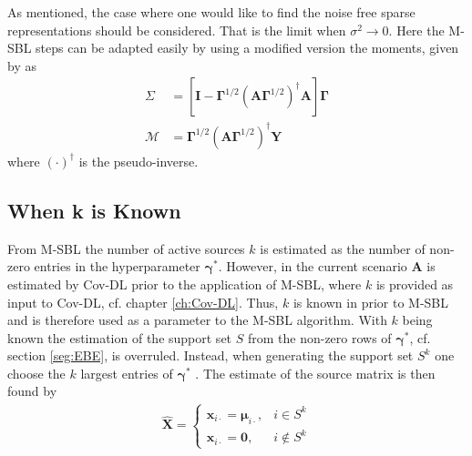 As mentioned, the case where one would like to find the noise free sparse representations should be considered. That is the limit when $\sigma^2\rightarrow 0$. Here the M-SBL steps can be adapted easily by using a modified version the moments, given by \cite[p.148]{phd_wipf} as 
\begin{align*}
\Sigma &= \left[ \textbf{I} - \boldsymbol{\Gamma}^{1/2} \left( \mathbf{A} \boldsymbol{\Gamma}^{1/2}\right)^{\dagger} \mathbf{A} \right]\boldsymbol{\Gamma}\\
\mathcal{M} &= \boldsymbol{\Gamma}^{1/2}\left( \mathbf{A} \boldsymbol{\Gamma}^{1/2}\right)^{\dagger} \mathbf{Y}
\end{align*} 
where $(\cdot)^{\dagger}$ is the pseudo-inverse.

\subsection{When k is Known}\label{subsec:kestimate}
From M-SBL the number of active sources $k$ is estimated as the number of non-zero entries in the hyperparameter $\boldsymbol{\gamma}^{\ast}$.
However, in the current scenario $\textbf{A}$ is estimated by Cov-DL prior to the application of M-SBL, where $k$ is provided as input to Cov-DL, cf. chapter \ref{ch:Cov-DL}.
Thus, $k$ is known in prior to M-SBL and is therefore used as a parameter to the M-SBL algorithm. 
With $k$ being known the estimation of the support set $S$ from the non-zero rows of $\boldsymbol{\gamma}^{\ast}$, cf. section \ref{seg:EBE}, is overruled.
Instead, when generating the support set $S^k$ one choose the $k$ largest entries of $\boldsymbol{\gamma}^{\ast}$ \cite[p. 3]{Balkan2014}.
The estimate of the source matrix is then found by
\begin{align*}
\hat{\mathbf{X}} = 
\begin{cases}
\mathbf{x}_{i\cdot} = \boldsymbol{\mu}_{i \cdot}, & i \in S^k \\
\mathbf{x}_{i\cdot} = \mathbf{0}, & i \not \in S^k
\end{cases}
\end{align*}



